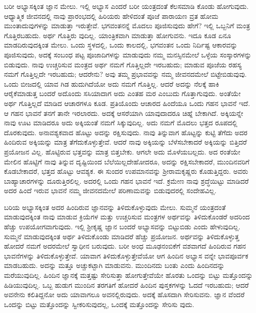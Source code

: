 ಬರೀ ಅಭ್ಯಾಸಕ್ಕಿಂತ ಜ್ಞಾನ ಮೇಲು. ಇಲ್ಲಿ ಅಭ್ಯಾಸ ಎಂದರೆ ಬರೀ ಯಂತ್ರದಂತೆ ಕೆಲಸಮಾಡಿ ಕೊಂಡು ಹೋಗುವುದು. ಆಧ್ಯಾತ್ಮಿಕ ಜೀವನದಲ್ಲಿ ನಾವು ಪ್ರಾರಂಭದಲ್ಲಿ ಹಿರಿಯರು ಹೇಳಿದಂತೆ ಪೂಜೆ ಪಾರಾಯಣ ವ್ರತ ಹೋಮ ಮುಂತಾದುವುಗಳನ್ನು ಮಾಡುತ್ತಾ ಇರುತ್ತೇವೆ. ಭಗವಂತನನ್ನೆ ಮೊದಲು ಪೂಜಿಸುವುದು ಹೇಗೆ? ಇಲ್ಲಿ ಒಬ್ಬನಿಗೆ ಮಂತ್ರ ಗೊತ್ತಿರಬಹುದು. ಅರ್ಥ ಗೊತ್ತಿರು ವುದಿಲ್ಲ. ಯಾಂತ್ರಿಕವಾಗಿ ಮಾಡುತ್ತಾ ಹೋಗುವನು. ಇದೂ ಕೂಡ ಏನೂ ಮಾಡದಿರುವುದಕ್ಕಿಂತ ಮೇಲು. ಒಂದು ಸ್ಥಳದಲ್ಲಿ, ಒಂದು ಕಾಲದಲ್ಲಿ, ಭಗವಂತನ ಒಂದು ನಿರ್ದಿಷ್ಟ ಆಕಾರವನ್ನು ಪೂಜಿಸುವುದು, ಅದಕ್ಕೆ ಸಂಬಂಧ ಪಟ್ಟ ಪೂಜಾದಿಗಳನ್ನು ಮಾಡುವುದು ನಮ್ಮ ಮನಸ್ಸಿನಮೇಲೆ ಒಳ್ಳೆಯ ಸಂಸ್ಕಾರಗಳನ್ನು ಬಿಡುವುದು. ನಾವು ಉಚ್ಚರಿಸುವ ಮಂತ್ರದ ಅರ್ಥ ನಮಗೆ ಗೊತ್ತಿಲ್ಲದೇ ಇರಬಹುದು; ಮಾಡುವ ಪೂಜೆಯ ರಹಸ್ಯ ನಮಗೆ ಗೊತ್ತಿಲ್ಲದೇ ಇರಬಹುದು; ಆದರೇನು? ಅವು ತಮ್ಮ ಪ್ರಭಾವವನ್ನು ನಮ್ಮ ಜೀವನದಮೇಲೆ ಬಿಟ್ಟೇಬಿಡುವುವು. ಒಂದು ಬೀಜದಲ್ಲಿ ಯಾವ ಗಿಡ ಹುದುಗಿದೆಯೋ ಅದು ನಮಗೆ ಗೊತ್ತಿಲ್ಲ. ಆದರೆ ಅದನ್ನು ನೆಲಕ್ಕೆ ಹಾಕಿ ಆರೈಕೆಮಾಡುತ್ತ ಬಂದರೆ ಅದೊಂದು ಸಸಿಯಾದಾಗ ಅದು ಎಂತಹ ಮರ ಎಂಬುದು ಗೊತ್ತಾಗುವುದು. ಅಂತೆಯೇ ಅರ್ಥ ಗೊತ್ತಿಲ್ಲದೆ ಮಾಡಿದ ಆಚಾರಗಳೂ ಕೂಡ. ಪ್ರತಿಯೊಂದು ಆಚಾರದ ಹಿಂದೆಯೂ ಒಂದು ಗಹನ ಭಾವನೆ ಇದೆ. ಆ ಗಹನ ಭಾವನೆ ತನಗೆ ತಾನೇ ಇರಲಾರದು. ಅದಕ್ಕೆ ಆಸರೆಯಾಗಿ ಯಾವುದಾದರೂ ಚಿಹ್ನೆ ಬೇಕಾಗಿದೆ. ಅಕ್ಕಿಯನ್ನೇ ನಾವು ಊಟ ಮಾಡಿದರೂ ಅದು ಅಕ್ಕಿಯಂತೆ ನಮಗೆ ಸಿಕ್ಕುವುದಿಲ್ಲ. ಅದು ನಮಗೆ ಮೊದಲು ಭತ್ತದ ರೂಪದಲ್ಲಿ ದೊರಕುವುದು. ಅನಾವಶ್ಯಕವಾದ ಹೊಟ್ಟು ಅದನ್ನು ರಕ್ಷಿಸುವುದು. ನಾವು ತಿನ್ನುವಾಗ ಹೊಟ್ಟನ್ನು ಕುಟ್ಟಿ ತೆಗೆದು ಅದರ ಹಿಂದಿರುವ ಅಕ್ಕಿಯನ್ನು ಮಾತ್ರ ತೆಗೆದುಕೊಳ್ಳುತ್ತೇವೆ. ಆದರೆ ನಾವು ಅಕ್ಕಿಯನ್ನು ಬೆಳೆಸಬೇಕಾದರೆ ಅಕ್ಕಿಯನ್ನು ಬಿತ್ತಿದರೆ ಪ್ರಯೋಜನ ವಿಲ್ಲ. ಹೊಟ್ಟಿರುವ ಭತ್ತವನ್ನು ಮಾತ್ರ ಬಿತ್ತಬೇಕು. ಆಗಲೇ ಅದು ಮೊಳೆಯಬಲ್ಲದು. ಅದ ರಂತೆಯೇ ಮೇಲಿನ ಹೊಟ್ಟಿಗೆ ನಾವು ತಿನ್ನುವ ದೃಷ್ಟಿಯಿಂದ ಬೆಲೆಯಿಲ್ಲದೇಹೋದರೂ, ಅದನ್ನು ರಕ್ಷಿಸಬೇಕಾದರೆ, ಮುಂದಿನವರಿಗೆ ಕೊಡಬೇಕಾದರೆ, ಭತ್ತದ ಹೊಟ್ಟು ಆವಶ್ಯಕ. ಈ ಸುಂದರ ಉಪಮಾನವನ್ನು ಶ್ರೀರಾಮಕೃಷ್ಣರು ಕೊಡುತ್ತಿದ್ದರು. ಅವರು ಬಾಹ್ಯಾಚಾರಗಳನ್ನು ದೂರುತ್ತಿರಲಿಲ್ಲ. ಅದರಲ್ಲಿ ಒಂದು ಗಹನ ಭಾವನೆ ಇದೆ. ಕ್ರಮೇಣ ನಾವು ಶ್ರದ್ಧೆಯಿಟ್ಟು ಮಾಡಿದರೆ ಅದರ ಹಿಂದೆ ಇರುವ ಭಾವನೆ ನಮ್ಮ ಜೀವನದಮೇಲೆ ಪರಿಣಾಮವನ್ನು ಬಿಡುವುದರಲ್ಲಿ ಸಂದೇಹವಿಲ್ಲ.

ಬರಿಯ ಅಭ್ಯಾಸಕ್ಕಿಂತ ಅದರ ಹಿಂದಿರುವ ಜ್ಞಾನವನ್ನು ತಿಳಿದುಕೊಳ್ಳುವುದು ಮೇಲು. ಸುಮ್ಮನೆ ಯಂತ್ರದಂತೆ ಮಾಡುವುದಕ್ಕಿಂತ ನಾವು ಮಾಡುವ ಕ್ರಿಯೆಗಳ ಮತ್ತು ಉಚ್ಚರಿಸುವ ಮಂತ್ರಗಳ ಅರ್ಥವನ್ನು ತಿಳಿದುಕೊಂಡರೆ ಅದರಿಂದ ಹೆಚ್ಚು ಉಪಯೋಗವಾಗುವುದು. ಇಲ್ಲಿ ಶ್ರೀಕೃಷ್ಣ ಜ್ಞಾನ ಬಂದರೆ ಅಭ್ಯಾಸವನ್ನು ಬಿಟ್ಟುಬಿಡು ಎಂದು ಹೇಳುವುದಿಲ್ಲ. ಸುಮ್ಮನೆ ಮಾಡುವುದಕ್ಕಿಂತ ಅರ್ಥ ತಿಳಿದುಕೊಂಡು ಮಾಡಿದರೆ ಹೆಚ್ಚು ಪ್ರಯೋಜನ. ಅರ್ಥವನ್ನು ತಿಳಿದುಕೊಳ್ಳುತ್ತ ಹೋದರೆ ನಮಗೆ ಅದರಮೇಲೆ ಸ್ವಾಧೀನ ಬರುವುದು. ಬರೀ ಅಂಧ ಮೂಢನಂಬಿಕೆಗೆ ವಶವಾಗದೆ ಹಿಂದಿರುವ ಗಹನ ಭಾವನೆಗಳನ್ನು ತಿಳಿದುಕೊಳ್ಳುತ್ತೇವೆ. ಯಾವಾಗ ತಿಳಿದುಕೊಳ್ಳುತ್ತೇವೆಯೋ ಆಗ ಹಿಂದಿನ ಅಭ್ಯಾಸ ವನ್ನೇ ಭಾವಪೂರ್ವಕ ಮಾಡಬಹುದು. ಅದನ್ನು ಮತ್ತೂ ಅಚ್ಚುಕಟ್ಟಾಗಿ ಮಾಡುವನು. ಮುಂದಿನದು ಬಂತು ಎಂದು ಹಿಂದಿನದನ್ನು ಮರೆಯುವುದಿಲ್ಲ. ಹಿಂದಿನ ಜ್ಞಾನಕ್ಕೆ ಮತ್ತಷ್ಟು ಸೇರಿಸುತ್ತಾ ಹೋಗುತ್ತೇವೆಯೇ ಹೊರತು ಒಂದನ್ನು ಬಿಟ್ಟು ಮತ್ತೊಂದನ್ನು ಹಿಡಿಯುವುದಿಲ್ಲ. ಒಬ್ಬ ಹುಡುಗ ಮುಂದಿನ ತರಗತಿಗೆ ಹೋದರೆ ಹಿಂದಿನ ಪುಸ್ತಕಗಳನ್ನು ಓದದೆ ಇರಬಹುದು; ಆದರೆ ಅವನೇನು ಕಲಿತಿದ್ದನೋ ಅದು ಯಾವಾಗಲೂ ಅವನಲ್ಲಿರುವುದು. ಅದಕ್ಕೆ ಹೊಸದಾಗಿ ಸೇರಿಸುವನು. ಜ್ಞಾನ ವೆಂದರೆ ಒಂದನ್ನು ಬಿಟ್ಟು ಮತ್ತೊಂದನ್ನು ಸ್ವೀಕರಿಸುವುದಲ್ಲ, ಒಂದಕ್ಕೆ ಮತ್ತೊಂದನ್ನು ಸೇರಿಸು ವುದು.

